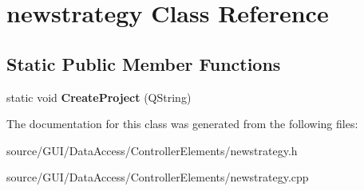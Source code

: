 \section{newstrategy Class Reference}
\label{classnewstrategy}
\subsection*{Static Public Member Functions}
\begin{DoxyCompactItemize}
\item 
static void {\bfseries Create\+Project} (Q\+String)\label{classnewstrategy_a34d2f8c784e1aa21c672491f0573e7e1}

\end{DoxyCompactItemize}


The documentation for this class was generated from the following files\+:\begin{DoxyCompactItemize}
\item 
source/\+G\+U\+I/\+Data\+Access/\+Controller\+Elements/newstrategy.\+h\item 
source/\+G\+U\+I/\+Data\+Access/\+Controller\+Elements/newstrategy.\+cpp\end{DoxyCompactItemize}
